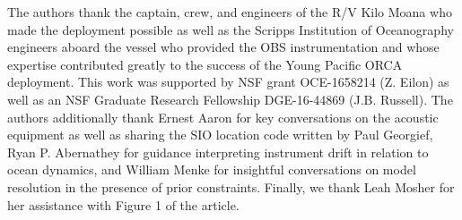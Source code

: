 The authors thank the captain, crew, and engineers of the R/V Kilo Moana who made the deployment possible as well as the Scripps Institution of Oceanography engineers aboard the vessel who provided the OBS instrumentation and whose expertise contributed greatly to the success of the Young Pacific ORCA deployment. This work was supported by NSF grant OCE-1658214 (Z. Eilon) as well as an NSF Graduate Research Fellowship DGE-16-44869 (J.B. Russell). The authors additionally thank Ernest Aaron for key conversations on the acoustic equipment as well as sharing the SIO location code written by Paul Georgief, Ryan P. Abernathey for guidance interpreting instrument drift in relation to ocean dynamics, and William Menke for insightful conversations on model resolution in the presence of prior constraints. Finally, we thank Leah Mosher for her assistance with Figure 1 of the article.